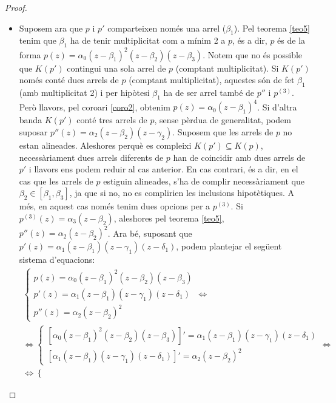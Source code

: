 \documentclass[11pt,a4paper]{article}
\theoremstyle{definition}
\begin{document}
\begin{proof}
\begin{itemize}
\begin{itemize}
                  \item Suposem ara que $p$ i $p'$ comparteixen només una arrel ($\beta_1$). Pel teorema \ref{teo5} tenim que $\beta_1$ ha de tenir multiplicitat com a mínim 2 a $p$, és a dir, $p$ és de la forma $p(z)=\alpha_0(z-\beta_1)^2(z-\beta_2)(z-\beta_3)$. Notem que no és possible que $K(p')$ contingui una sola arrel de $p$ (comptant multiplicitat). Si $K(p')$ només conté dues arrels de $p$ (comptant multiplicitat), aquestes són de fet $\beta_1$ (amb multiplicitat 2) i per hipòtesi $\beta_1$ ha de ser arrel també de $p''$ i $p^{(3)}$. Però llavors, pel coro\lgem ari \ref{coro2}, obtenim $p(z)=\alpha_0(z-\beta_1)^4$. Si d'altra banda $K(p')$ conté tres arrels de $p$, sense pèrdua de generalitat, podem suposar $p''(z)=\alpha_2(z-\beta_2)(z-\gamma_2)$. Suposem que les arrels de $p$ no estan alineades. Aleshores perquè es compleixi $K(p')\subseteq K(p)$, necessàriament dues arrels diferents de $p$ han de coincidir amb dues arrels de $p'$ i llavors ens podem reduir al cas anterior. En cas contrari, és a dir, en el cas que les arrels de $p$ estiguin alineades, s'ha de complir necessàriament que $\beta_2\in[\beta_1,\beta_3]$, ja que si no, no es complirien les inclusions hipotètiques. A més, en aquest cas només tenim dues opcions per a $p^{(3)}$. Si $p^{(3)}(z)=\alpha_3(z-\beta_2)$, aleshores pel teorema \ref{teo5}, $p''(z)=\alpha_2(z-\beta_2)^2$. Ara bé, suposant que $p'(z)=\alpha_1(z-\beta_1)(z-\gamma_1)(z-\delta_1)$, podem plantejar el següent sistema d'equacions:
                        \begin{multline*}
                            \left\{\begin{array}{l}
                                p(z)=\alpha_0(z-\beta_1)^2(z-\beta_2)(z-\beta_3)  \\
                                p'(z)=\alpha_1(z-\beta_1)(z-\gamma_1)(z-\delta_1) \\
                                p''(z)=\alpha_2(z-\beta_2)^2
                            \end{array}\right.\iff\\\iff\left\{\begin{array}{l}
                                \left[\alpha_0(z-\beta_1)^2(z-\beta_2)(z-\beta_3)\right]'=\alpha_1(z-\beta_1)(z-\gamma_1)(z-\delta_1) \\
                                \left[\alpha_1(z-\beta_1)(z-\gamma_1)(z-\delta_1)\right]'=\alpha_2(z-\beta_2)^2
                            \end{array}\right.\iff\\\iff\left\{\begin{array}{l}

\end{array}
\end{multline*}
\end{itemize}
\end{itemize}
\end{proof}
\end{document}
